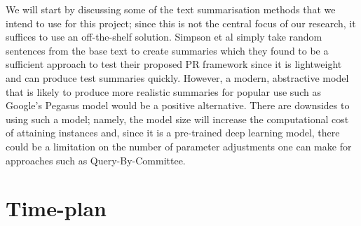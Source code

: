 \documentclass[ %
                    author={James Stephenson},
                supervisor={Dr. Edwin Simpson},
                    degree={MSc},
                     title={Project Plan: Bayesian Deep Learning For Extractive Test Summarisation},
                  subtitle={},
                      type={},
                      year={2022}]{../additions/dissertation}
\begin{document}
		We will start by discussing some of the text summarisation methods that we intend to use for this project; since this is not the central focus of our research, it suffices to use an off-the-shelf solution. Simpson et al \cite{Simpson19} simply take random sentences from the base text to create summaries which they found to be a sufficient approach to test their proposed PR framework since it is lightweight and can produce test summaries quickly. However, a modern, abstractive model that is likely to produce more realistic summaries for popular use such as Google’s Pegasus model \cite{Zhao19} would be a positive alternative. There are downsides to using such a model; namely, the model size will increase the computational cost of attaining instances and, since it is a pre-trained deep learning model, there could be a limitation on the number of parameter adjustments one can make for approaches such as Query-By-Committee.
		
	
	
	
	\backmatter
	
	
	
	
	
	\appendix
	
	\chapter{Time-plan}
		\label{appx:timeplan}
		
\end{document}
